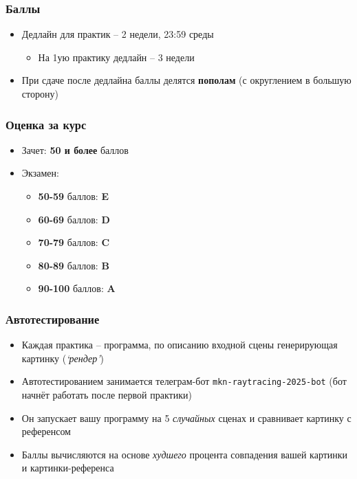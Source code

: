 \documentclass[10pt]{beamer}
\begin{document}
\begin{frame}
\frametitle{Баллы}
\begin{itemize}
\item Дедлайн для практик -- 2 недели, 23:59 среды
\pause
\begin{itemize}
\item На 1ую практику дедлайн -- 3 недели
\end{itemize}
\pause
\item При сдаче после дедлайна баллы делятся \textbf{пополам} (с округлением в большую сторону)
\end{itemize}
\end{frame}

\begin{frame}
\frametitle{Оценка за курс}
\pause
\begin{itemize}
\item Зачет: \textbf{50 и более} баллов
\pause
\item Экзамен:
\begin{itemize}
\item \textbf{50-59} баллов: \textbf{E}
\item \textbf{60-69} баллов: \textbf{D}
\item \textbf{70-79} баллов: \textbf{C}
\item \textbf{80-89} баллов: \textbf{B}
\item \textbf{90-100} баллов: \textbf{A}
\end{itemize}
\end{itemize}
\end{frame}

\begin{frame}
\frametitle{Автотестирование}
\begin{itemize}
\item Каждая практика -- программа, по описанию входной сцены генерирующая картинку (\textit{`рендер'})
\pause
\item Автотестированием занимается телеграм-бот \texttt{mkn-raytracing-2025-bot} (бот начнёт работать после первой практики)
\pause
\item Он запускает вашу программу на 5 \textit{случайных} сценах и сравнивает картинку с референсом
\pause
\item Баллы вычисляются на основе \textit{худшего} процента совпадения вашей картинки и картинки-референса
\end{itemize}
\end{frame}
\end{document}
